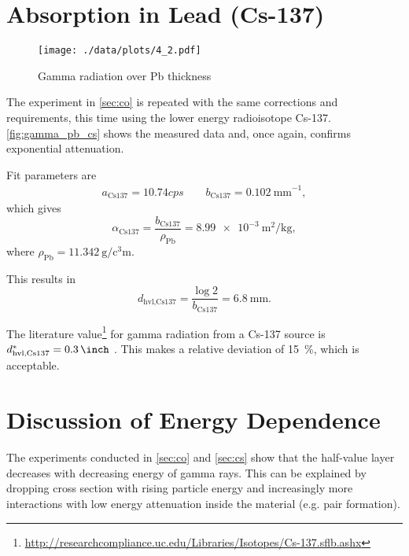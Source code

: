 \section{Absorption in Lead (Cs-137)}\label{sec:cs}
\begin{figure}[ht!]
	\centering
	\texttt{[image: ./data/plots/4\_2.pdf]}
	\caption[Gamma radiation over Pb thickness (Cs-137)]{Gamma radiation over Pb thickness}
	\label{fig:gamma_pb_cs}
\end{figure}

The experiment in \autoref{sec:co} is repeated with the same corrections and requirements, this time using the lower energy radioisotope Cs-137.
\autoref{fig:gamma_pb_cs} shows the measured data and, once again, confirms exponential attenuation.

Fit parameters are
\begin{gather*}
	a_\text{Cs137}=\num{10.74}cps\qquad b_\text{Cs137}=\SI{0.102}{\milli\meter}^{-1},
\end{gather*}
which gives
\begin{equation*}
	\alpha_\text{Cs137}=\frac{b_\text{Cs137}}{\rho_\text{Pb}}=\SI{8.99e-3}{\meter\squared\per\kilogram},
\end{equation*}
where $\rho_\text{Pb}=\SI{11.342}{\gram\per\cubic\centi\meter}$.

This results in
\begin{equation*}
	d_\text{hvl,Cs137}=\frac{\log{2}}{b_\text{Cs137}}=\SI{6.8}{\milli\meter}.
\end{equation*}

The literature value\footnote{\url{http://researchcompliance.uc.edu/Libraries/Isotopes/Cs-137.sflb.ashx}} for gamma radiation from a Cs-137 source is $d_\text{hvl,Cs137}^{*}=\SI{0.3}{\inch}$ .
This makes a relative deviation of \SI{15}{\percent}, which is acceptable.

\section{Discussion of Energy Dependence}
The experiments conducted in \autoref{sec:co} and \autoref{sec:cs} show that the half-value layer decreases with decreasing energy of gamma rays.
This can be explained by dropping cross section with rising particle energy and increasingly more interactions with low energy attenuation inside the material (e.g. pair formation).

